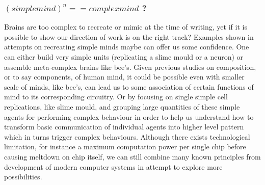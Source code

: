 \documentclass[11pt]{article}
\newenvironment{sketch}{\color{dark-green-2}}{\ignorespacesafterend}
\begin{document}
\begin{sketch}
\subsubsection*{ $ (simple mind)^n == complex mind$ ?}
Brains are too complex to recreate or mimic at the time of writing, yet if it is possible to show our direction of work is on the right track? Examples shown in attempts on recreating simple minds maybe can offer us some confidence. One can either build very simple units (replicating a slime mould or a neuron) or assemble meta-complex brains like bee's. Given previous studies on composition, or to say components, of human mind, it could be possible even with smaller scale of minds, like bee's, can lead us to some association of certain functions of mind to its corresponding circuitry. Or by focusing on single simple cell replications, like slime mould, and grouping large quantities of these simple agents for performing complex behaviour in order to help us understand how to transform basic communication of individual agents into higher level pattern which in turns trigger complex behaviours. Although there exists technological limitation, for instance a maximum computation power per single chip before causing meltdown on chip itself, we can still combine many known principles from development of modern computer systems in attempt to explore more possibilities. 
\end{sketch}
\end{document}
